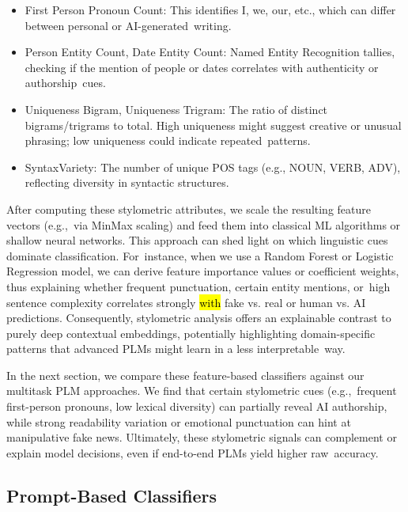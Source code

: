 \documentclass[electronics,article,accept,pdftex,moreauthors,electronics]{Definitions/mdpi}
\begin{document}
\begin{itemize}
  \item First Person Pronoun Count:
  This identifies I, we, our, etc., which can differ between personal or AI-generated~writing.

  \item Person Entity Count, Date Entity Count:
  Named Entity Recognition tallies, checking if the mention of people or dates correlates with authenticity or authorship~cues.

  \item Uniqueness Bigram, Uniqueness Trigram:
  The ratio of distinct bigrams/trigrams to total. High uniqueness might suggest creative or unusual phrasing; low uniqueness could indicate repeated~patterns.

  \item SyntaxVariety:
  The number of unique POS tags (e.g., NOUN, VERB, ADV), 
  reflecting diversity in syntactic structures.
\end{itemize}

After computing these stylometric attributes, we scale the resulting feature vectors (e.g.,~via 
MinMax scaling) and feed them into classical ML algorithms or shallow neural networks. This approach can shed light on which linguistic cues dominate classification. For~instance, when we use a Random Forest or Logistic Regression model, we can derive feature importance values or coefficient weights, thus explaining whether frequent punctuation, certain entity mentions, or~high sentence complexity correlates strongly \hl{with} %
 fake vs. real or human vs. AI predictions. Consequently, stylometric analysis offers an explainable contrast to purely deep contextual embeddings, potentially highlighting domain-specific patterns that advanced PLMs might learn in a less interpretable~way.

In the next section, we compare these feature-based classifiers against our multitask 
PLM approaches. We find that certain stylometric cues (e.g.,~frequent first-person pronouns, low lexical diversity) can partially reveal AI authorship, while strong readability variation or emotional punctuation can hint at manipulative fake news. Ultimately, these stylometric signals can complement or explain model decisions, even if end-to-end PLMs yield higher raw~accuracy.


\subsection{Prompt-Based Classifiers}
\label{sec:prompt_based}
\end{document}
